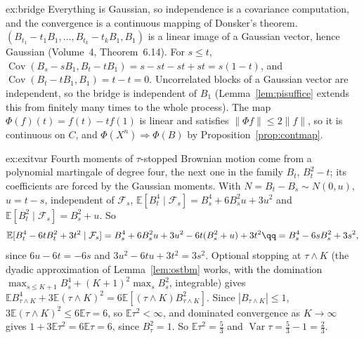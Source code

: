 \begin{solution}{ex:bridge}
\idea Everything is Gaussian, so independence is a covariance computation, and the convergence is a continuous mapping of Donsker's theorem.
\writeup $(B_{t_1}-t_1B_1,\dots,B_{t_k}-t_kB_1,B_1)$ is a linear image of a Gaussian vector, hence Gaussian (Volume~4, Theorem~6.14). For $s\le t$,
$\operatorname{Cov}(B_s-sB_1,B_t-tB_1)=s-st-st+st=s(1-t)$, and $\operatorname{Cov}(B_t-tB_1,B_1)=t-t=0$. Uncorrelated blocks of a Gaussian vector are independent, so the bridge is independent
of $B_1$ (Lemma~\ref{lem:pisuffice} extends this from finitely many times to the whole process). The map $\Phi(f)(t)=f(t)-tf(1)$ is linear and satisfies $\|\Phi f\|\le2\|f\|$, so it is
continuous on $C$, and $\Phi(X^n)\Rightarrow\Phi(B)$ by Proposition~\ref{prop:contmap}.
\end{solution}

\begin{solution}{ex:exitvar}
\idea Fourth moments of $\tau$-stopped Brownian motion come from a polynomial martingale of degree four, the next one in the family $B_t$, $B_t^2-t$; its coefficients are forced by
the Gaussian moments.
\writeup With $N=B_t-B_s\sim N(0,u)$, $u=t-s$, independent of $\mathcal F_s$, $\mathbb E[B_t^4\mid\mathcal F_s]=B_s^4+6B_s^2u+3u^2$ and $\mathbb E[B_t^2\mid\mathcal F_s]=B_s^2+u$. So
\[
\begin{gathered}
\mathbb E[B_t^4-6tB_t^2+3t^2\mid\mathcal F_s]=B_s^4+6B_s^2u+3u^2-6t(B_s^2+u)+3t^2\qq=B_s^4-6sB_s^2+3s^2,
\end{gathered}
\]
since $6u-6t=-6s$ and $3u^2-6tu+3t^2=3s^2$. Optional stopping at $\tau\wedge K$ (the dyadic approximation of Lemma~\ref{lem:ostbm} works, with the domination
$\max_{s\le K+1}B_s^4+(K+1)^2\max_sB_s^2$, integrable) gives $\mathbb E B_{\tau\wedge K}^4+3\mathbb E(\tau\wedge K)^2=6\mathbb E[(\tau\wedge K)B_{\tau\wedge K}^2]$. Since $|B_{\tau\wedge K}|\le1$,
$3\mathbb E(\tau\wedge K)^2\le6\mathbb E\tau=6$, so $\mathbb E\tau^2<\infty$, and dominated convergence as $K\to\infty$ gives $1+3\mathbb E\tau^2=6\mathbb E\tau=6$, since $B_\tau^2=1$. So $\mathbb E\tau^2=\frac53$
and $\operatorname{Var}\tau=\frac53-1=\frac23$.
\end{solution}

